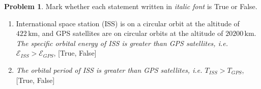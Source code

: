 \documentclass[10pt]{article}
\theoremstyle{definition}
\newtheorem{prob}{Problem}[section]
\renewcommand{\theprob}{\arabic{prob}}
\newenvironment{subprob}%
{\renewcommand{\theenumi}{\alph{enumi}}\renewcommand{\labelenumi}{(\theenumi)}\begin{enumerate}}%
{\end{enumerate}}%
\begin{document}
\renewcommand{\theprob}{\arabic{prob} \textit{(15pt)}}
\begin{prob}
Mark whether each statement written in \textit{italic font} is True or False.
\begin{subprob}


%
%
%
%
%
%
%
%

\item International space station (ISS) is on a circular orbit at the altitude of $422\,\mathrm{km}$, and GPS satellites are on circular orbits at the altitude of $20200\,\mathrm{km}$. \textit{The specific orbital energy of ISS is greater than GPS satellites, i.e. $\mathcal{E}_{ISS} > \mathcal{E}_{GPS}$}, [True, False]

\vspace*{1cm}

\item \textit{The orbital period of ISS is greater than GPS satellites, i.e. $T_{ISS} > T_{GPS}$}, [True, False]

\vspace*{1cm}


\end{subprob}
\end{prob}
\end{document}
